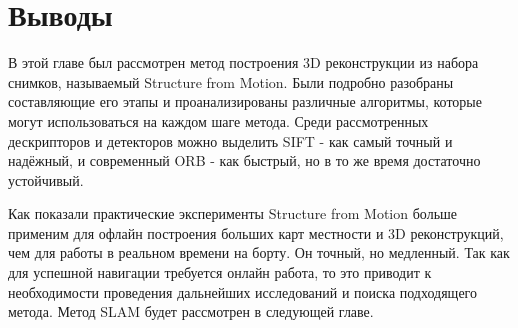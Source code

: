 \section{Выводы}

В этой главе был рассмотрен метод построения 3D реконструкции из набора снимков, называемый Structure from Motion. Были подробно разобраны составляющие его этапы и проанализированы различные алгоритмы, которые могут использоваться на каждом шаге метода. Среди рассмотренных дескрипторов и детекторов можно выделить SIFT - как самый точный и надёжный, и современный ORB - как быстрый, но в то же время достаточно устойчивый.

Как показали практические эксперименты Structure from Motion больше применим для офлайн построения больших карт местности и 3D реконструкций, чем для работы в реальном времени на борту. Он точный, но медленный. Так как для успешной навигации требуется онлайн работа, то это приводит к необходимости проведения дальнейших исследований и поиска подходящего метода. Метод SLAM будет рассмотрен в следующей главе.